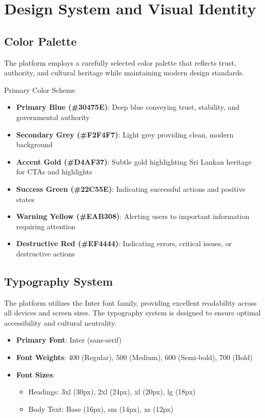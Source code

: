 \documentclass[12pt,a4paper]{article}
\begin{document}
\section{Design System and Visual Identity}

\subsection{Color Palette}

The platform employs a carefully selected color palette that reflects trust, authority, and cultural heritage while maintaining modern design standards.

\begin{designbox}{Primary Color Scheme}
\begin{itemize}
    \item \textbf{Primary Blue (\textcolor{primary}{\#30475E})}: Deep blue conveying trust, stability, and governmental authority
    \item \textbf{Secondary Grey (\textcolor{secondary}{\#F2F4F7})}: Light grey providing clean, modern background
    \item \textbf{Accent Gold (\textcolor{accent}{\#D4AF37})}: Subtle gold highlighting Sri Lankan heritage for CTAs and highlights
    \item \textbf{Success Green (\textcolor{success}{\#22C55E})}: Indicating successful actions and positive states
    \item \textbf{Warning Yellow (\textcolor{warning}{\#EAB308})}: Alerting users to important information requiring attention
    \item \textbf{Destructive Red (\textcolor{destructive}{\#EF4444})}: Indicating errors, critical issues, or destructive actions
\end{itemize}
\end{designbox}

\subsection{Typography System}

The platform utilizes the Inter font family, providing excellent readability across all devices and screen sizes. The typography system is designed to ensure optimal accessibility and cultural neutrality.

\begin{itemize}
    \item \textbf{Primary Font}: Inter (sans-serif)
    \item \textbf{Font Weights}: 400 (Regular), 500 (Medium), 600 (Semi-bold), 700 (Bold)
    \item \textbf{Font Sizes}: 
        \begin{itemize}
            \item Headings: 3xl (30px), 2xl (24px), xl (20px), lg (18px)
            \item Body Text: Base (16px), sm (14px), xs (12px)
        \end{itemize}
\end{itemize}
\end{document}
